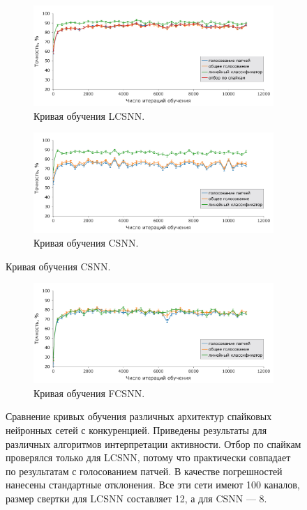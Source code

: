 \documentclass[a4paper]{article}
\begin{document}
\begin{figure}[H]
\centering
\begin{subfigure}{\textwidth}
    \includegraphics[width=\textwidth,keepaspectratio=true]{LCSNN_learning_rate_ru.pdf}
 \caption{Кривая обучения LCSNN.}
\end{subfigure} 
\begin{subfigure}{\textwidth} 
    \includegraphics[width=\textwidth,keepaspectratio=true]{CSNN_learning_rate_ru.pdf}
 \caption{Кривая обучения CSNN.}
\end{subfigure}
\end{figure}
\begin{figure}[H]\ContinuedFloat
\begin{subfigure}{\textwidth} 
    \includegraphics[width=\textwidth,keepaspectratio=true]{FCSNN_learning_rate_ru.pdf}
 \caption{Кривая обучения FCSNN.} 
\end{subfigure}
\caption{Сравнение кривых обучения различных архитектур спайковых нейронных сетей с конкуренцией. Приведены результаты для различных алгоритмов интерпретации активности. Отбор по спайкам проверялся только для LCSNN, потому что практически совпадает по результатам с голосованием патчей. В качестве погрешностей нанесены стандартные отклонения. Все эти сети имеют 100 каналов, размер свертки для LCSNN составляет 12, а для CSNN --- 8.}
\end{figure}
\end{document}
